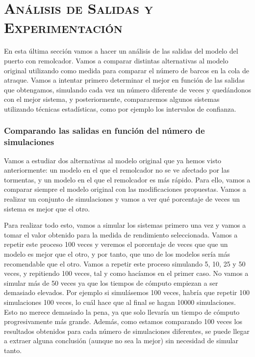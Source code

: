 \documentclass[11pt,a4paper]{article}
\begin{document}
\newpage

\section{\textsc{Análisis de Salidas y Experimentación}}

En esta última sección vamos a hacer un análisis de las salidas del modelo
del puerto con remolcador. Vamos a comparar distintas alternativas al modelo
original utilizando como medida para comparar el número de barcos en la cola de
atraque. Vamos a intentar primero determinar el mejor en función de las salidas
que obtengamos, simulando cada vez un número diferente de veces y quedándonos
con el mejor sistema, y posteriormente, compararemos algunos sistemas utilizando
técnicas estadísticas, como por ejemplo los intervalos de confianza.

\subsubsection{Comparando las salidas en función del número de simulaciones}

Vamos a estudiar dos alternativas al modelo original que ya hemos visto anteriormente:
un modelo en el que el remolcador no se ve afectado por las tormentas, y un modelo
en el que el remolcador es más rápido. Para ello, vamos a comparar siempre el modelo
original con las modificaciones propuestas. Vamos a realizar un conjunto de simulaciones
y vamos a ver qué porcentaje de veces un sistema es mejor que el otro.

Para realizar todo esto, vamos a simular los sistemas primero una vez y vamos a tomar
el valor obtenido para la medida de rendimiento seleccionada. Vamos a repetir este
proceso 100 veces y veremos el porcentaje de veces que que un modelo es mejor
que el otro, y por tanto, que uno de los modelos sería más recomendable que el otro.
Vamos a repetir este proceso simulando 5, 10, 25 y 50 veces, y
repitiendo 100 veces, tal y como hacíamos en el primer caso. No vamos a simular
más de 50 veces ya que los tiempos de cómputo empiezan a ser demasiado elevados.
Por ejemplo si simulásemos 100 veces, habría que repetir 100 simulaciones 100 veces,
lo cuál hace que al final se hagan 10000 simulaciones. Esto no merece demasiado
la pena, ya que solo llevaría un tiempo de cómputo progresivamente más grande.
Además, como estamos comparando 100 veces los resultados obtenidos para cada
número de simulaciones diferentes, se puede llegar a extraer alguna conclusión
(aunque no sea la mejor) sin necesidad de simular tanto.
\end{document}
